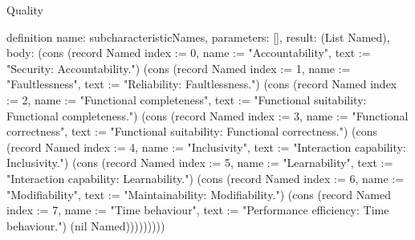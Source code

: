 \begin{lexlean}{Quality}
\begin{semanticmodule}
definition{
  name: subcharacteristicNames,
  parameters: [],
  result: (List Named),
  body: (cons (record Named {index := 0, name := "Accountability", text := "Security: Accountability."}) (cons (record Named {index := 1, name := "Faultlessness", text := "Reliability: Faultlessness."}) (cons (record Named {index := 2, name := "Functional completeness", text := "Functional suitability: Functional completeness."}) (cons (record Named {index := 3, name := "Functional correctness", text := "Functional suitability: Functional correctness."}) (cons (record Named {index := 4, name := "Inclusivity", text := "Interaction capability: Inclusivity."}) (cons (record Named {index := 5, name := "Learnability", text := "Interaction capability: Learnability."}) (cons (record Named {index := 6, name := "Modifiability", text := "Maintainability: Modifiability."}) (cons (record Named {index := 7, name := "Time behaviour", text := "Performance efficiency: Time behaviour."}) (nil Named)))))))))
}


\end{semanticmodule}
\end{lexlean}
